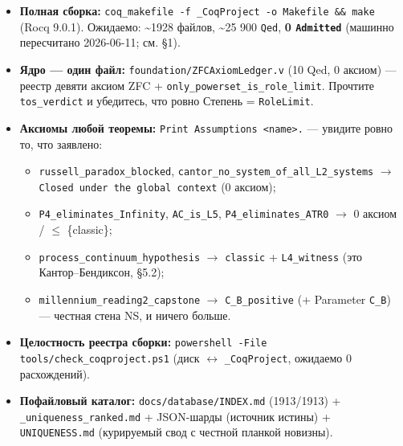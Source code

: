 \documentclass[11pt,a4paper]{article}
\begin{document}
\begin{itemize}
\item \textbf{Полная сборка:} \texttt{coq\_\allowbreak{}makefile -f \_\allowbreak{}Coq\allowbreak{}Project -o Makefile \&\& make} (Rocq 9.0.1). Ожидаемо: \textasciitilde{}1928 файлов, \textasciitilde{}25 900 \texttt{Qed}, \textbf{0 \texttt{Admitted}} (машинно пересчитано 2026-06-11; см. \S{}1).
\item \textbf{Ядро --- один файл:} \texttt{foundation/\allowbreak{}ZFCAxiom\allowbreak{}Ledger.v} (10 Qed, 0 аксиом) --- реестр девяти аксиом ZFC + \texttt{only\_\allowbreak{}powerset\_\allowbreak{}is\_\allowbreak{}role\_\allowbreak{}limit}. Прочтите \texttt{tos\_\allowbreak{}verdict} и убедитесь, что ровно Степень = \texttt{Role\allowbreak{}Limit}.
\item \textbf{Аксиомы любой теоремы:} \texttt{Print Assumptions <name>.} --- увидите ровно то, что заявлено:
\begin{itemize}
\item \texttt{russell\_\allowbreak{}paradox\_\allowbreak{}blocked}, \texttt{cantor\_\allowbreak{}no\_\allowbreak{}system\_\allowbreak{}of\_\allowbreak{}all\_\allowbreak{}L2\_\allowbreak{}systems} $\to$ \texttt{Closed under the global context} (0 аксиом);
\item \texttt{P4\_\allowbreak{}eliminates\_\allowbreak{}Infinity}, \texttt{AC\_\allowbreak{}is\_\allowbreak{}L5}, \texttt{P4\_\allowbreak{}eliminates\_\allowbreak{}ATR0} $\to$ 0 аксиом / $\le$ \{classic\};
\item \texttt{process\_\allowbreak{}continuum\_\allowbreak{}hypothesis} $\to$ \texttt{classic} + \texttt{L4\_\allowbreak{}witness} (это Кантор--Бендиксон, \S{}5.2);
\item \texttt{millennium\_\allowbreak{}reading2\_\allowbreak{}capstone} $\to$ \texttt{C\_\allowbreak{}B\_\allowbreak{}positive} (+ Parameter \texttt{C\_\allowbreak{}B}) --- честная стена NS, и ничего больше.
\end{itemize}
\item \textbf{Целостность реестра сборки:} \texttt{powershell -File tools/\allowbreak{}check\_\allowbreak{}coqproject.ps1} (диск $\leftrightarrow$ \texttt{\_\allowbreak{}Coq\allowbreak{}Project}, ожидаемо 0 расхождений).
\item \textbf{Пофайловый каталог:} \texttt{docs/\allowbreak{}database/\allowbreak{}INDEX.md} (1913/1913) + \texttt{\_\allowbreak{}uniqueness\_\allowbreak{}ranked.md} + JSON-шарды (источник истины) + \texttt{UNIQUENESS.md} (курируемый свод с честной планкой новизны).
\end{itemize}
\end{document}
